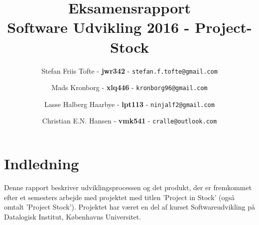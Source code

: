 \documentclass[12pt]{article}
\title{
  \vspace{3cm}
  \Huge{Eksamensrapport} \\
  \Large{Software Udvikling 2016 - Project-Stock}
	}
\author{
	\Large{Stefan Friis Tofte} - \textbf{jwr342} - \texttt{stefan.f.tofte@gmail.com}
	\and
	\Large{Mads Kronborg} - \textbf{xlq446} - \texttt{kronborg96@gmail.com}
	\and
	\Large{Lasse Halberg Haarbye} - \textbf{lpt113} - \texttt{ninjalf2@gmail.com}
	\and
	\Large{Christian E.N. Hansen} - \textbf{vmk541} - \texttt{cralle@outlook.com}
}
\def \ColourPDF {../include/ku-farve}
\def \TitlePDF {../include/ku-en}  %
\begin{document}


\clearpage\maketitle
\thispagestyle{empty}

\newpage
\tableofcontents
\newpage

\section{Indledning}
\label{sec:indledning}
Denne rapport beskriver udviklingsprocessen og det produkt, der er fremkommet efter et semesters arbejde med projektet med titlen 'Project in Stock' (også omtalt 'Project Stock'). Projektet har været en del af kurset Softwareudvikling på Datalogisk Institut, Københavns Universitet.
\end{document}
